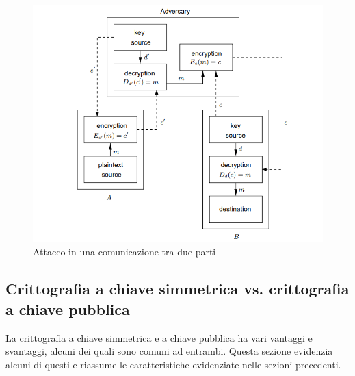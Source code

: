 \documentclass{article}
\theoremstyle{definition}
\begin{document}
\begin{figure}[H]
    \centering
    \includegraphics[width=\textwidth]{img/kkk.png}
    \caption{Attacco in una comunicazione tra due parti}
    \label{fig:itm}
\end{figure}

\subsection{Crittografia a chiave simmetrica vs. crittografia a chiave pubblica}

La crittografia a chiave simmetrica e a chiave pubblica ha vari vantaggi e svantaggi, alcuni dei quali sono comuni ad entrambi. Questa sezione evidenzia alcuni di questi e riassume le caratteristiche evidenziate nelle sezioni precedenti.
\end{document}
